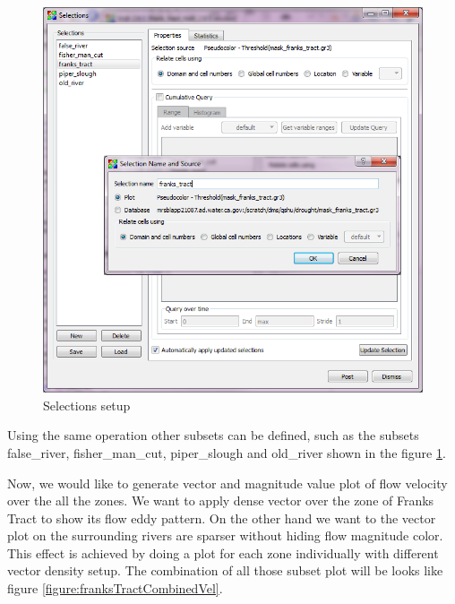\documentclass[12pt]{report}
\begin{document}
\begin{figure}
\begin{center}
\includegraphics{franksTractSelections}
\caption{Selections setup }
\label{figure:franksTractSelections}
\end{center}
\end{figure} 	


Using the same operation other subsets can be defined, such as the subsets false\_river, fisher\_man\_cut, piper\_slough and old\_river shown
in the figure \ref{figure:franksTractSelections}.

Now, we would like to generate  vector and magnitude value plot of flow velocity over the all the zones. We want to apply dense vector over
the zone of Franks Tract to show its flow eddy pattern. On the other hand we want to the vector plot on the surrounding rivers are sparser without hiding flow magnitude color. This effect is achieved by doing a plot for each zone individually with different vector density setup.
The combination of all those subset plot will be looks like figure \ref{figure:franksTractCombinedVel}.
\end{document}
